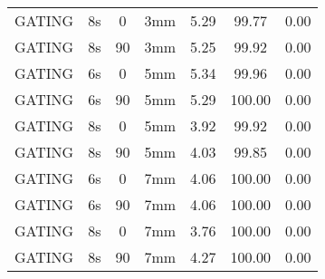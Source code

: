 \begin{table}[H]
\begin{tabular}{|c||c|c|c||c|c|c|}
GATING & 8s & 0 & 3mm & 5.29 & 99.77 & 0.00 \\
GATING & 8s & 90 & 3mm & 5.25 & 99.92 & 0.00 \\
GATING & 6s & 0 & 5mm & 5.34 & 99.96 & 0.00 \\
GATING & 6s & 90 & 5mm & 5.29 & 100.00 & 0.00 \\
GATING & 8s & 0 & 5mm & 3.92 & 99.92 & 0.00 \\
GATING & 8s & 90 & 5mm & 4.03 & 99.85 & 0.00 \\
GATING & 6s & 0 & 7mm & 4.06 & 100.00 & 0.00 \\
GATING & 6s & 90 & 7mm & 4.06 & 100.00 & 0.00 \\
GATING & 8s & 0 & 7mm & 3.76 & 100.00 & 0.00 \\
GATING & 8s & 90 & 7mm & 4.27 & 100.00 & 0.00 \\
    \hline\hline 
  \end{tabular}
\end{table}


\newpage


